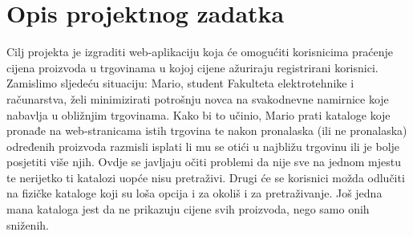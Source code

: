 \chapter{Opis projektnog zadatka}
		
		
		
		Cilj projekta je izgraditi web-aplikaciju koja će omogućiti korisnicima praćenje cijena proizvoda u trgovinama u kojoj cijene ažuriraju registrirani korisnici. Zamislimo sljedeću situaciju: Mario, student Fakulteta elektrotehnike i računarstva, želi minimizirati potrošnju novca na svakodnevne namirnice koje nabavlja u obližnjim trgovinama. Kako bi to učinio, Mario prati kataloge koje pronađe na web-stranicama istih trgovina te nakon pronalaska (ili ne pronalaska) određenih proizvoda razmisli isplati li mu se otići u najbližu trgovinu ili je bolje posjetiti više njih. Ovdje se javljaju očiti problemi da nije sve na jednom mjestu te nerijetko ti katalozi uopće nisu pretraživi. Drugi će se korisnici možda odlučiti na fizičke kataloge koji su loša opcija i za okoliš i za pretraživanje. Još jedna mana kataloga jest da ne prikazuju cijene svih proizvoda, nego samo onih sniženih.\\
		
